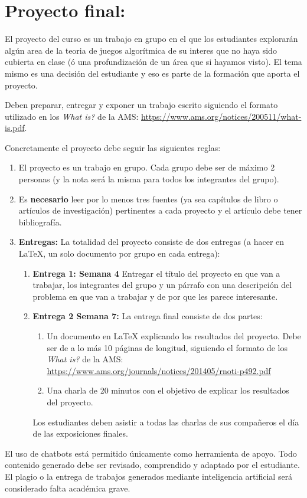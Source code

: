 \documentclass[11pt]{article}
\date{}
\begin{document}
\section*{Proyecto final:}
El proyecto del curso es un trabajo en grupo en el que los estudiantes explorarán algún area de la teoria de juegos algorítmica de su interes que no haya sido cubierta en clase (ó una profundización de un área que si hayamos visto). El tema mismo es una decisión del estudiante y eso es parte de la formación que aporta el proyecto.

Deben preparar, entregar y exponer un trabajo escrito siguiendo el formato utilizado en los \textit{What is?} de la AMS: \url{https://www.ams.org/notices/200511/what-is.pdf}.

Concretamente el proyecto debe seguir las siguientes reglas:

\begin{enumerate}
    \item El proyecto es un trabajo en grupo. Cada grupo debe ser de máximo 2 personas (y la nota será la misma para todos los integrantes del grupo).

    \item Es {\bf necesario} leer por lo menos tres fuentes (ya sea capítulos de libro o artículos de investigación) pertinentes a cada proyecto y el artículo debe tener bibliografía.

    \item \textbf{Entregas:} La totalidad del proyecto consiste de dos entregas (a hacer en \LaTeX, un solo documento por grupo en cada entrega):
    
    \begin{enumerate}[label=\alph*)]
        \item \textbf{Entrega 1: Semana 4} Entregar el título del proyecto en que van a trabajar, los integrantes del grupo y un párrafo con una descripción del problema en que van a trabajar y de por que les parece interesante.        
        \item \textbf{Entrega 2 Semana 7:} La entrega final consiste de dos partes:
        \begin{enumerate}
            \item Un documento en \LaTeX{} explicando los resultados del proyecto. Debe ser de a lo más 10 páginas de longitud, siguiendo el formato de los \textit{What is?} de la AMS: \url{https://www.ams.org/journals/notices/201405/rnoti-p492.pdf}
            \item Una charla de 20 minutos con el objetivo de explicar los resultados del proyecto.            
        \end{enumerate}
            Los estudiantes deben asistir a todas las charlas de sus compañeros el día de las exposiciones finales.
    \end{enumerate}
\end{enumerate}
El uso de chatbots está permitido únicamente como herramienta de apoyo. Todo contenido generado debe ser revisado, comprendido y adaptado por el estudiante. El plagio o la entrega de trabajos generados mediante inteligencia artificial será considerado falta académica grave.
\end{document}
